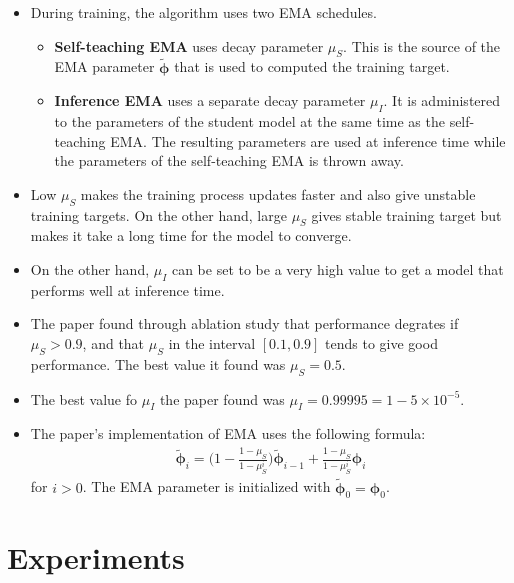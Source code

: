 \documentclass[10pt]{article}
\newcommand{\ves}[1]{\boldsymbol{#1}}
\begin{document}
\begin{itemize}
  \item During training, the algorithm uses two EMA schedules.
  \begin{itemize}
    \item {\bf Self-teaching EMA} uses decay parameter $\mu_S$. This is the source of the EMA parameter $\tilde{\ves{\phi}}$ that is used to computed the training target.
    
    \item {\bf Inference EMA} uses a separate decay parameter $\mu_I$. It is administered to the parameters of the student model at the same time as the self-teaching EMA. The resulting parameters are used at inference time while the parameters of the self-teaching EMA is thrown away.
  \end{itemize}

  \item Low $\mu_S$ makes the training process updates faster and also give unstable training targets. On the other hand, large $\mu_S$ gives stable training target but makes it take a long time for the model to converge.
  
  \item On the other hand, $\mu_I$ can be set to be a very high value to get a model that performs well at inference time.
  
  \item The paper found through ablation study that performance degrates if $\mu_S > 0.9$, and that $\mu_S$ in the interval $[0.1, 0.9]$ tends to give good performance. The best value it found was $\mu_S = 0.5$.
  
  \item The best value fo $\mu_I$ the paper found was $\mu_I = 0.99995 = 1 - 5 \times 10^{-5}$.
  
  \item The paper's implementation of EMA uses the following formula:
  \begin{align*}
    \tilde{\ves{\phi}}_i = \bigg( 1 - \frac{1 - \mu_S}{1 - \mu_S^i} \bigg) \tilde{\ves{\phi}}_{i-1} + \frac{1 - \mu_S}{1 - \mu_S^i} \ves{\phi}_i
  \end{align*}
  for $i > 0$. The EMA parameter is initialized with $\tilde{\ves{\phi}}_0 = \ves{\phi}_0$.
\end{itemize}

\section{Experiments}
\end{document}

